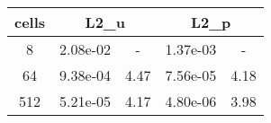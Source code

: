 \documentclass[10pt]{report}
\begin{document}
\begin{table}[H]
\begin{center}
\begin{tabular}{|c|c|c|c|c|} \hline
cells & 
\multicolumn{2}{|c|}{L2_u} & 
\multicolumn{2}{|c|}{L2_p}\\ \hline
8 & 2.08e-02 & - & 1.37e-03 & -\\ \hline
64 & 9.38e-04 & 4.47 & 7.56e-05 & 4.18\\ \hline
512 & 5.21e-05 & 4.17 & 4.80e-06 & 3.98\\ \hline
\end{tabular}
\end{center}
\end{table}
\end{document}
